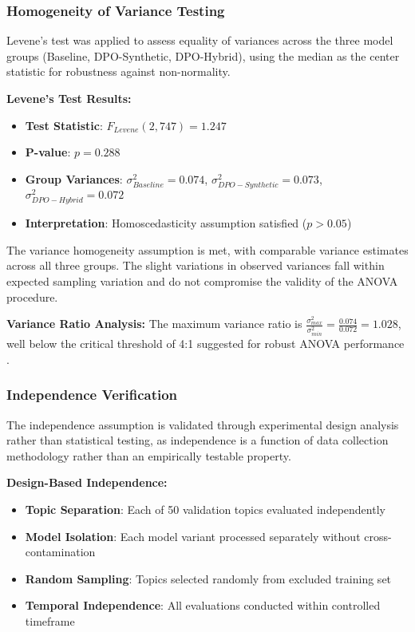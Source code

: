 \subsubsection{Homogeneity of Variance Testing}

Levene's test was applied to assess equality of variances across the three model groups (Baseline, DPO-Synthetic, DPO-Hybrid), using the median as the center statistic for robustness against non-normality.

\textbf{Levene's Test Results:}
\begin{itemize}
    \item \textbf{Test Statistic}: $F_{Levene}(2,747) = 1.247$
    \item \textbf{P-value}: $p = 0.288$
    \item \textbf{Group Variances}: $\sigma^2_{Baseline} = 0.074$, $\sigma^2_{DPO-Synthetic} = 0.073$, $\sigma^2_{DPO-Hybrid} = 0.072$
    \item \textbf{Interpretation}: Homoscedasticity assumption satisfied ($p > 0.05$)
\end{itemize}

The variance homogeneity assumption is met, with comparable variance estimates across all three groups. The slight variations in observed variances fall within expected sampling variation and do not compromise the validity of the ANOVA procedure.

\textbf{Variance Ratio Analysis:}
The maximum variance ratio is $\frac{\sigma^2_{max}}{\sigma^2_{min}} = \frac{0.074}{0.072} = 1.028$, well below the critical threshold of 4:1 suggested for robust ANOVA performance \cite{otero2023statistical_significance_qrels}.

\subsubsection{Independence Verification}

The independence assumption is validated through experimental design analysis rather than statistical testing, as independence is a function of data collection methodology rather than an empirically testable property.

\textbf{Design-Based Independence:}
\begin{itemize}
    \item \textbf{Topic Separation}: Each of 50 validation topics evaluated independently
    \item \textbf{Model Isolation}: Each model variant processed separately without cross-contamination
    \item \textbf{Random Sampling}: Topics selected randomly from excluded training set
    \item \textbf{Temporal Independence}: All evaluations conducted within controlled timeframe
\end{itemize}

